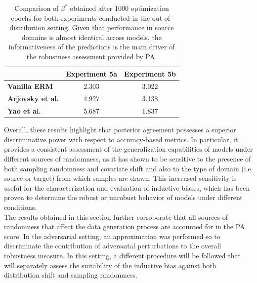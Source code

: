 \begin{table}[H]
    \centering
    \begin{tabular}{l|c|c}
     & \textbf{Experiment 5a} & \textbf{Experiment 5b}\\
    \midrule
    \textbf{{\color{tab:blue} \textbf{Vanilla ERM}}} & 2.303  & 3.022   \\
    \textbf{{\color{tab:orange} \textbf{Arjovsky et al.}}} & 4.927  & 3.138  \\
    \textbf{{\color{tab:green} \textbf{Yao et al.}}} & 5.687 & 1.837 \\
    \bottomrule
    \end{tabular}
    \caption{
        Comparison of $\beta^{*}$ obtained after 1000 optimization epochs for both experiments 
        conducted in the out-of-distribution setting. Given that performance in source domains is
        almost identical across models, the informativeness of the predictions is the main driver
        of the robustness assessment provided by PA.
    }
    \label{tab:datashift_betas}
\end{table}

Overall, these results highlight that posterior agreement possesses a superior discriminative power
with respect to accuracy-based metrics. In particular, it provides a consistent assessment of the
generalization capabilities of models under different sources of randomness, as it has shown to be
sensitive to the presence of both sampling randomness and covariate shift and also to the type of 
domain (i.e. source or target) from which samples are drawn. This increased sensitivity is useful 
for the characterization and evaluation of inductive biases, which has been proven to 
determine the robust or unrobust behavior of models under different conditions. \\

The results obtained in this section further corroborate that all sources of randomness
that affect the data generation process are accounted for in the PA score. In the adversarial
setting, an approximation was performed so to discriminate the contribution of adversarial perturbations to
the overall robustness measure. In this setting, a different procedure will be followed that will separately
assess the suitability of the inductive bias against both distribution shift and sampling randomness. \\

